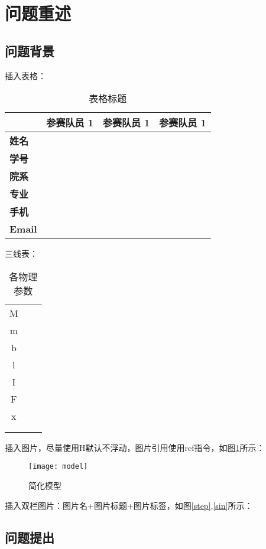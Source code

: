 \section{问题重述}

\subsection{问题背景}

插入表格：
\begin{table}[H]
    \centering
    \begin{tabular}{|p{1.8cm}|p{4.5cm}|p{4.5cm}|p{4.5cm}|}
        \hline
         & 参赛队员 1 & 参赛队员 1 & 参赛队员 1\\\hline
        \textbf{姓名} & & & \\\hline
        \textbf{学号} & & & \\\hline
        \textbf{院系} & & & \\\hline
        \textbf{专业} & & & \\\hline
        \textbf{手机} & & & \\\hline
        \textbf{Email} & & & \\\hline
    \end{tabular} 
    \caption{表格标题}\label{tab-1}
\end{table}

三线表：
\begin{table}[H]
    \centering
    \begin{tabular}{FlF}
        \toprule  
         &  & \\
        \midrule
        M &  & \\
		m &  & \\
		b &  & \\
		l &  & \\
		I &  & \\
		F &  & \\
		x &  & \\
		\phi &  & \\
		\theta &  & \\
        \bottomrule
    \end{tabular}
    \caption{各物理参数}\label{tab-arg}
\end{table}

插入图片，尽量使用H默认不浮动，图片引用使用ref指令，如图\ref{model}所示：
\begin{figure}[H]
	\centering
	\texttt{[image: model]}\\
	\caption{简化模型}\label{model}
\end{figure}

插入双栏图片：图片名+图片标题+图片标签，如图\ref{step},\ref{sin}所示：

\subsection{问题提出}

